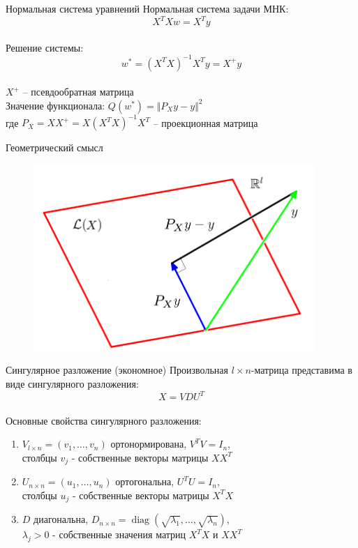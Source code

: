\documentclass[10pt]{beamer}
\begin{document}
\begin{frame}{Нормальная система уравнений}
	Нормальная система задачи МНК:
	$$X^T X w = X^T y$$\\
	\pause
	Решение системы:\\
	$$w^* = (X^T X)^{-1} X^T y = X^{+} y$$\\
	$X^{+}$ -- псевдообратная матрица\\
	\bigbreak
	\pause
	Значение функционала: $Q(w^*) = \Vert P_X y - y \Vert^2$\\
	\bigbreak
	где $P_X = X X^{+} = X(X^T X)^{-1} X^T$ -- проекционная матрица
\end{frame}

\begin{frame}{Геометрический смысл}
	\begin{figure}[htbp]
	  \includegraphics[height=200pt, keepaspectratio = true]{images/geometry}   
	\end{figure}
\end{frame}

{
\begin{frame}{Сингулярное разложение (экономное)}
	Произвольная $l \times n$-матрица представима в виде сингулярного разложения:\\
	$$X = VDU^T$$\\
	\bigbreak
	\pause
	Основные свойства сингулярного разложения:\\
	\begin{enumerate}[--]
		\item $V_{l \times n} = (v_1, \dots, v_n)$ ортонормирована, $V^TV = I_n$, \\столбцы $v_j$ - собственные векторы матрицы $XX^T$
		\item $U_{n \times n} = (u_1, \dots, u_n)$ ортогональна, $U^TU = I_n$, \\столбцы $u_j$ - собственные векторы матрицы $X^TX$
		\item $D$ диагональна, $D_{n \times n} = \operatorname{diag} (\sqrt{\lambda_1}, \dots, \sqrt{\lambda_n})$, \\$\lambda_j > 0$ - собственные значения матриц $X^TX$ и $XX^T$
	\end{enumerate}
\end{frame}
}
\end{document}
